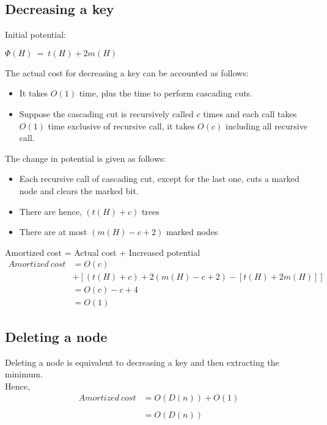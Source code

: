 \subsection{Decreasing a key}
Initial potential:
\begin{center}
	$\Phi{(H)} \ = \ t(H) + 2m(H)$
\end{center}
The actual cost for decreasing a key can be accounted as follows: 
\begin{itemize}
	\item It takes $O(1)$ time, plus the time to perform cascading cuts.
	\item Suppose the cascading cut is recursively called $c$ times and each call takes $O(1)$ time exclusive of recursive call, it takes $O(c)$ including all recursive call.
\end{itemize}
The change in potential is given as follows:
\begin{itemize}
	\item Each recursive call of cascading cut, except for the last one, cuts a marked node and clears the marked bit.
	\item There are hence, $(t(H) + c)$ trees
	\item There are at most $( m(H) - c + 2 )$ marked nodes
\end{itemize}
Amortized cost = Actual cost + Increased potential
\begin{equation}
	\begin{split}
		Amortized \ cost &= O(c) \\
		& + [ (t(H) + c) + 2(m(H) - c + 2) - [t(H)+2m(H)] ]
		\\&= O(c) - c + 4
		\\&= O(1)
	\end{split}
\end{equation}
\subsection{Deleting a node}
Deleting a node is equivalent to decreasing a key and then extracting the minimum.\\
Hence, 
\begin{equation}
	\begin{split}
		Amortized \ cost &= O(D(n)) + O(1)\\
		\\&= O(D(n))
	\end{split}
\end{equation}
